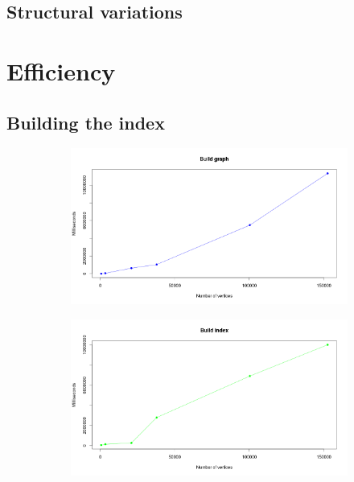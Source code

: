 \documentclass[thesis.tex]{subfiles}
\begin{document}
\subsection{Structural variations}
\clearpage
\section{Efficiency}
\subsection{Building the index}
\begin{figure}
  \begin{subfigure}[t]{0.5\textwidth}
    \includegraphics[width=\textwidth]{plots/build_index_build_graph.png}
    \subcaption{}
  \end{subfigure}
  \begin{subfigure}[t]{0.49\textwidth}
    \includegraphics[width=\textwidth]{plots/build_index_build_index.png}
    \subcaption{}
  \end{subfigure}
  \begin{subfigure}[b]{0.5\textwidth}

\end{subfigure}
\end{figure}
\end{document}
